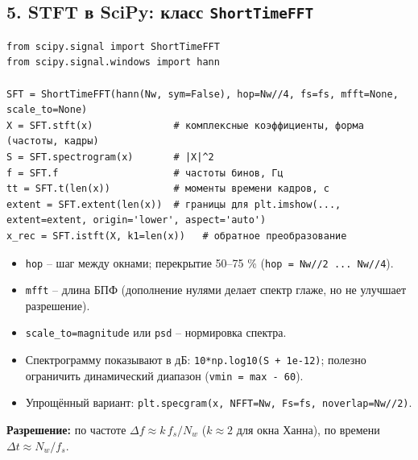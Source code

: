 \documentclass[12pt,a4paper,openany]{book}
\providecommand{\tightlist}{\setlength{\itemsep}{0pt}\setlength{\parskip}{0pt}}
\begin{document}
\subsection*{\texorpdfstring{5. STFT в SciPy: класс \texttt{ShortTimeFFT}}{5. STFT в SciPy: класс ShortTimeFFT}}

\begin{Verbatim}[fontsize=\small, breaklines, breakanywhere]
from scipy.signal import ShortTimeFFT
from scipy.signal.windows import hann

SFT = ShortTimeFFT(hann(Nw, sym=False), hop=Nw//4, fs=fs, mfft=None, scale_to=None)
X = SFT.stft(x)              # комплексные коэффициенты, форма (частоты, кадры)
S = SFT.spectrogram(x)       # |X|^2
f = SFT.f                    # частоты бинов, Гц
tt = SFT.t(len(x))           # моменты времени кадров, с
extent = SFT.extent(len(x))  # границы для plt.imshow(..., extent=extent, origin='lower', aspect='auto')
x_rec = SFT.istft(X, k1=len(x))   # обратное преобразование
\end{Verbatim}

\begin{itemize}
\tightlist
\item
  \texttt{hop} -- шаг между окнами; перекрытие 50--75 \% (\texttt{hop\ =\allowbreak{}\ Nw/\allowbreak{}/\allowbreak{}2\ .\allowbreak{}.\allowbreak{}.\allowbreak{}\ Nw/\allowbreak{}/\allowbreak{}4}).
\item
  \texttt{mfft} -- длина БПФ (дополнение нулями делает спектр глаже, но не улучшает разрешение).
\item
  \texttt{scale\_\allowbreak{}to=\allowbreak{}\textquotesingle{}\allowbreak{}magnitude\textquotesingle{}\allowbreak{}} или \texttt{\textquotesingle{}\allowbreak{}psd\textquotesingle{}\allowbreak{}} -- нормировка спектра.
\item
  Спектрограмму показывают в дБ: \texttt{10*np.\allowbreak{}log10(\allowbreak{}S\ +\ 1e-12)}; полезно ограничить динамический диапазон (\texttt{vmin\ =\allowbreak{}\ max\ -\ 60}).
\item
  Упрощённый вариант: \texttt{plt.\allowbreak{}specgram(\allowbreak{}x,\allowbreak{}\ NFFT=\allowbreak{}Nw,\allowbreak{}\ Fs=\allowbreak{}fs,\allowbreak{}\ noverlap=\allowbreak{}Nw/\allowbreak{}/\allowbreak{}2)}.
\end{itemize}

\textbf{Разрешение:} по частоте \(\Delta f \approx k\,f_s/N_w\) (\(k \approx 2\) для окна Ханна), по времени \(\Delta t \approx N_w/f_s\).
\end{document}
